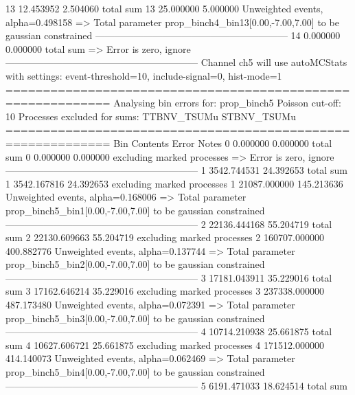 13         12.453952       2.504060        total sum                     
13         25.000000       5.000000        Unweighted events, alpha=0.498158
  => Total parameter prop_binch4_bin13[0.00,-7.00,7.00] to be gaussian constrained
------------------------------------------------------------
14         0.000000        0.000000        total sum                     
  => Error is zero, ignore      
------------------------------------------------------------
Channel ch5 will use autoMCStats with settings: event-threshold=10, include-signal=0, hist-mode=1
============================================================
Analysing bin errors for: prop_binch5
Poisson cut-off: 10
Processes excluded for sums: TTBNV_TSUMu STBNV_TSUMu
============================================================
Bin        Contents        Error           Notes                         
0          0.000000        0.000000        total sum                     
0          0.000000        0.000000        excluding marked processes    
  => Error is zero, ignore      
------------------------------------------------------------
1          3542.744531     24.392653       total sum                     
1          3542.167816     24.392653       excluding marked processes    
1          21087.000000    145.213636      Unweighted events, alpha=0.168006
  => Total parameter prop_binch5_bin1[0.00,-7.00,7.00] to be gaussian constrained
------------------------------------------------------------
2          22136.444168    55.204719       total sum                     
2          22130.609663    55.204719       excluding marked processes    
2          160707.000000   400.882776      Unweighted events, alpha=0.137744
  => Total parameter prop_binch5_bin2[0.00,-7.00,7.00] to be gaussian constrained
------------------------------------------------------------
3          17181.043911    35.229016       total sum                     
3          17162.646214    35.229016       excluding marked processes    
3          237338.000000   487.173480      Unweighted events, alpha=0.072391
  => Total parameter prop_binch5_bin3[0.00,-7.00,7.00] to be gaussian constrained
------------------------------------------------------------
4          10714.210938    25.661875       total sum                     
4          10627.606721    25.661875       excluding marked processes    
4          171512.000000   414.140073      Unweighted events, alpha=0.062469
  => Total parameter prop_binch5_bin4[0.00,-7.00,7.00] to be gaussian constrained
------------------------------------------------------------
5          6191.471033     18.624514       total sum                     

